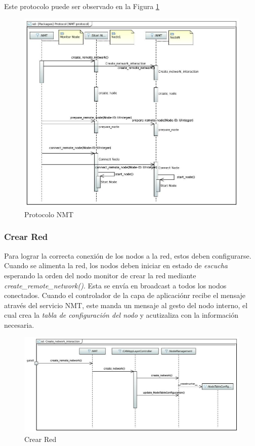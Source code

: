 Este protocolo puede ser observado en la Figura \ref{fig:ProtocolNMTConnectNet}
\begin{figure}[h!]
 \centering
 \includegraphics[scale=0.4]{images/Secciones/AppendixA/Protocol_NMT.JPG}
  \caption{Protocolo NMT}
  \label{fig:ProtocolNMTConnectNet}
\end{figure} 

\subsubsection{Crear Red}\label{NMT:crear_red}
Para lograr la correcta conexión de los nodos a la red, estos deben
configurarse. Cuando se alimenta la red, los nodos deben iniciar en estado de
\textit{escucha} esperando la orden del nodo monitor de crear la red mediante
\textit{create\_remote\_network()}. Esta se envía en broadcast a todos los nodos
conectados. Cuando el controlador de la capa de aplicaciónr recibe el mensaje
através del servicio NMT, este manda un mensaje al gesto del nodo interno, el
cual crea la \textit{tabla de configuración del nodo} y acutizaliza con la
información necesaria.

\begin{figure}[h!]
 \centering
 \includegraphics[scale=0.4]{images/Secciones/AppendixA/Create_Network.JPG}
  \caption{Crear Red}
  \label{fig:CreateNetwork}
\end{figure} 

